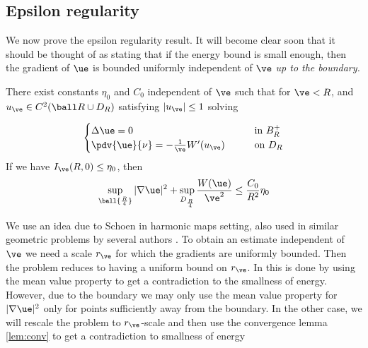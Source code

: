\subsection{Epsilon regularity} We now prove the epsilon regularity result. It will become clear soon that it should be thought of as stating that if the energy bound is small enough, then the gradient of $\ue$ is bounded uniformly independent of $\ve$ \textit{up to the boundary.} 


\begin{theo}  There exist constants $\eta_0$ and $C_0$ independent of $\ve$ such that for $\ve <R$, and $u_\ve \in C^2(\ball R \cup D_R)$ satisfying $|u_\ve| \leq 1$ solving 

    \begin{equation} \label{eqn:Rscale}
        \begin{cases}
            \Delta \ue = 0 \qquad &\text{in } B_R^+ \\
            \pdv{\ue}{\nu} = -\frac{1}{\ve}W'(u_\ve) \qquad  &\text{on  } D_R
        \end{cases}
    \end{equation}
If we have $I_{\ve}(R,0) \leq \eta_0$, then 
    \begin{equation} \label{epsreg}
        \sup_{\ball {\frac{R}{4}}} |\nabla \ue|^2 + \sup_{D_{\frac{R}{4}}} \frac{W(\ue)}{\ve ^2} \leq \frac{C_0}{R^2}\eta_0
    \end{equation}
\end{theo}
\begin{rem}
We use an idea due to Schoen \cite{s} in harmonic maps setting, also used in similar geometric problems by several authors \cite{cs,cw,ms,t,w}. To obtain an estimate independent of $\ve$ we need a scale $r_{\ve}$ for which the gradients are uniformly bounded. Then the problem reduces to having a uniform bound on $r_{\ve}$. In \cite{s} this is done by using the mean value property to get a contradiction to the smallness of energy. However, due to the boundary we may only use the mean value property for $|\nabla \ue|^2$ only for points sufficiently away from the boundary. In the other case, we will rescale the problem to $r_{\ve}$-scale and then use the convergence lemma \ref{lem:conv} to get a contradiction to smallness of energy
\end{rem}

